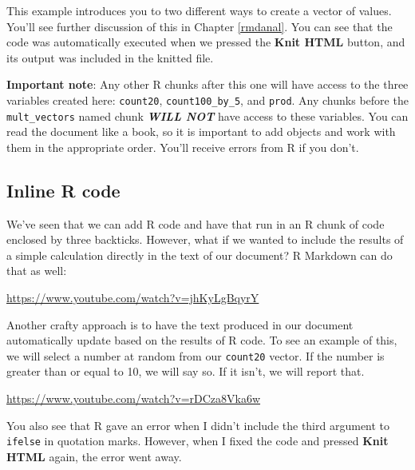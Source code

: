 \documentclass[]{tufte-book}
\begin{document}
This example introduces you to two different ways to create a vector of values. You'll see further discussion of this in Chapter \ref{rmdanal}. You can see that the code was automatically executed when we pressed the \textbf{Knit HTML} button, and its output was included in the knitted file.

\textbf{Important note}: Any other R chunks after this one will have access to the three variables created here: \texttt{count20}, \texttt{count100\_by\_5}, and \texttt{prod}. Any chunks before the \texttt{mult\_vectors} named chunk \textbf{\emph{WILL NOT}} have access to these variables. You can read the document like a book, so it is important to add objects and work with them in the appropriate order. You'll receive errors from R if you don't.

\subsection{Inline R code}\label{inline-r-code}

We've seen that we can add R code and have that run in an R chunk of code enclosed by three backticks. However, what if we wanted to include the results of a simple calculation directly in the text of our document? R Markdown can do that as well:

\vspace{0.1in}\begin{center}\footnotesize{\url{https://www.youtube.com/watch?v=jhKyLgBqyrY}}\end{center}\vspace{0.1in}

Another crafty approach is to have the text produced in our document automatically update based on the results of R code. To see an example of this, we will select a number at random from our \texttt{count20} vector. If the number is greater than or equal to 10, we will say so. If it isn't, we will report that.

\vspace{0.1in}\begin{center}\footnotesize{\url{https://www.youtube.com/watch?v=rDCza8Vka6w}}\end{center}\vspace{0.1in}

You also see that R gave an error when I didn't include the third argument to \texttt{ifelse} in quotation marks. However, when I fixed the code and pressed \textbf{Knit HTML} again, the error went away.
\end{document}
